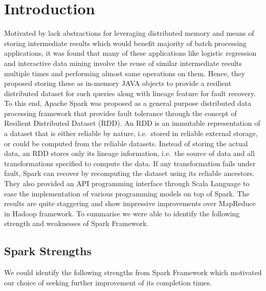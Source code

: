 \documentclass[conference]{sig-alternate-05-2015}
\begin{document}
\section{Introduction}
Motivated by lack abstractions for leveraging distributed memory and means of storing intermediate results which would benefit majority of batch processing applications, it was found that many of these applications like logistic regression and interactive data mining involve the reuse of similar intermediate results multiple times and performing almost same operations on them. Hence, they proposed storing these as in-memory JAVA objects to provide a resilient distributed dataset for such queries along with lineage feature for fault recovery. To this end, Apache Spark \cite{Zaharia2012} was proposed as a general purpose distributed data processing framework that provides fault tolerance through the concept of Resilient Distributed Dataset (RDD). An RDD is an immutable representation of a dataset that is either reliable by nature, i.e.\ stored in reliable external storage, or could be computed from the reliable datasets. Instead of storing the actual data, an RDD stores only its lineage information, i.e.\ the source of data and all transformations specified to compute the data. If any transformation fails under fault, Spark can recover by recomputing the dataset using its reliable ancestors. They also provided an API programming interface through Scala Language to ease the implementation of various programming models on top of Spark. The results are quite staggering and show impressive improvements over MapReduce in Hadoop framework. To summarise we were able to identify the following strength and weaknesses of Spark Framework.

\subsection{Spark Strengths}
We could identify the following strengths from Spark Framework which motivated our choice of seeking further improvement of its completion times.
\end{document}

